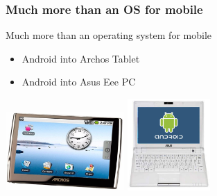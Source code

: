 \documentclass{beamer}
\begin{document}
\begin{frame}
\frametitle{Much more than an OS for mobile}

\begin{center}
\begin{large}
Much more than an operating system for mobile
\end{large}
\end{center}
\hspace{0.2cm}

\begin{itemize}

\item Android into Archos Tablet
\item Android into Asus Eee PC 
\end{itemize}

\begin{center}
\includegraphics[height=3.0cm]{figs/archos-android}
\vspace{2.0cm}
\includegraphics[height=3.5cm]{figs/eee_pc_android}
\end{center}

\end{frame}
\end{document}
